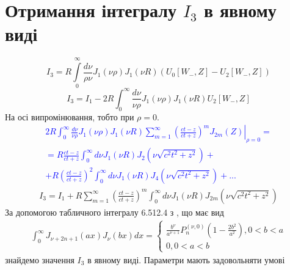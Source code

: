 \section{Отримання інтегралу $ I_3 $ в явному виді}

\begin{equation}
I_3 = R \int \limits_{0}^{\infty} \frac{d \nu}{\rho \nu} 
J_1(\nu \rho) J_1(\nu R) (U_0[ W_-, Z ] - U_2[ W_-, Z ])
\end{equation}
%
\begin{equation} \label{eq:intergal3}
I_3 = I_1 - 2 R \int_{0}^{\infty} \frac{d \nu}{\nu \rho} 
J_1(\nu \rho) J_1(\nu R) U_2[ W_-, Z ]
\end{equation}
%
На осі випромінювання, тобто при $ \rho = 0 $. 
%
\textcolor{blue}{ \begin{equation*} \begin{aligned}
\left. 2 R \int_{0}^{\infty} \frac{d \nu}{\nu \rho} 
J_1(\nu \rho) J_1(\nu R) \sum_{m=1}^{\infty} \left( 
\frac{ct - z}{ct + z} \right)^m J_{2m} (Z) 
\right|_{\rho = 0} = \\ = R \frac{ct - z}{ct + z} \int_{0}^{\infty} 
d \nu J_1(\nu R) J_2 (\nu \sqrt{c^2t^2 + z^2}) + \\ 
+ R \left( \frac{ct - z}{ct + z} \right)^2 
\int_{0}^{\infty} d \nu J_1(\nu R) J_4 (\nu \sqrt{c^2t^2 + z^2}) + ...
\end{aligned} \end{equation*} }
%
\begin{equation} \begin{aligned} \label{eq:i3_pol_int}
I_3 = I_1 + R \sum_{m=1}^{\infty} \left( \frac{ct - z}{ct + z} \right)^m 
\int_{0}^{\infty} d \nu J_1(\nu R) J_{2m} (\nu \sqrt{c^2t^2 + z^2})
\end{aligned} \end{equation}
%
За допомогою табличного інтегралу 6.512.4 з 
\cite[ст. 681]{imp:GradshtejnInt}, що має вид
%
\begin{equation*} \begin{aligned}
\int_0^\infty J_{\nu+2n+1} (ax) J_\nu (bx) dx = 
\begin{cases} \frac{b^\nu}{a^{\nu+1}}
P_n^{(\nu,0)} \left( 1 - \frac{2b^2}{a^2} \right) , 0 < b < a \\
0, 0 < a < b \end{cases}
\end{aligned} \end{equation*}
%
знайдемо значення $ I_3 $ в явному виді. Параметри мають задовольняти умові  
